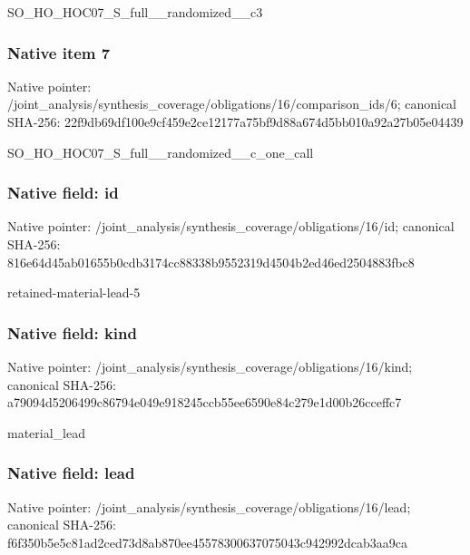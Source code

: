 \documentclass[10pt,a4paper]{article}
\begin{document}
\begingroup\raggedright\sloppy SO\_\allowbreak{}HO\_\allowbreak{}HOC07\_\allowbreak{}S\_\allowbreak{}full\_\allowbreak{}\_\allowbreak{}randomized\_\allowbreak{}\_\allowbreak{}c3\par\endgroup

\subsubsection{Native item 7}
Native pointer: /joint\_\allowbreak{}analysis/synthesis\_\allowbreak{}coverage/obligations/16/comparison\_\allowbreak{}ids/6; canonical SHA-256: 22f9db69df100e9cf459e2ce12177a75bf9d88a674d5bb010a92a27b05e04439

\begingroup\raggedright\sloppy SO\_\allowbreak{}HO\_\allowbreak{}HOC07\_\allowbreak{}S\_\allowbreak{}full\_\allowbreak{}\_\allowbreak{}randomized\_\allowbreak{}\_\allowbreak{}c\_\allowbreak{}one\_\allowbreak{}call\par\endgroup

\subsubsection{Native field: id}
Native pointer: /joint\_\allowbreak{}analysis/synthesis\_\allowbreak{}coverage/obligations/16/id; canonical SHA-256: 816e64d45ab01655b0cdb3174cc88338b9552319d4504b2ed46ed2504883fbc8

\begingroup\raggedright\sloppy retained-material-lead-5\par\endgroup

\subsubsection{Native field: kind}
Native pointer: /joint\_\allowbreak{}analysis/synthesis\_\allowbreak{}coverage/obligations/16/kind; canonical SHA-256: a79094d5206499c86794e049e918245ccb55ee6590e84c279e1d00b26cceffc7

\begingroup\raggedright\sloppy material\_\allowbreak{}lead\par\endgroup

\subsubsection{Native field: lead}
Native pointer: /joint\_\allowbreak{}analysis/synthesis\_\allowbreak{}coverage/obligations/16/lead; canonical SHA-256: f6f350b5e5c81ad2ced73d8ab870ee45578300637075043c942992dcab3aa9ca
\end{document}
